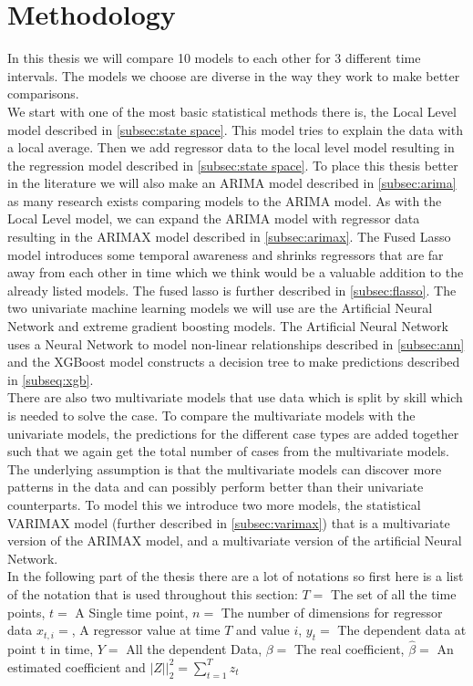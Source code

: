\section{Methodology}
\label{seq:methodology}
In this thesis we will compare 10 models to each other for 3 different time intervals. The models we choose are diverse in the way they work to make better comparisons.\\

We start with one of the most basic statistical methods there is, the Local Level model described in \ref{subsec:state space}. This model tries to explain the data with a local average. Then we add regressor data to the local level model resulting in the regression model described in \autoref{subsec:state space}. To place this thesis better in the literature we will also make an ARIMA model described in \autoref{subsec:arima} as many research exists comparing models to the ARIMA model. As with the Local Level model, we can expand the ARIMA model with regressor data resulting in the ARIMAX model described in \autoref{subsec:arimax}. The Fused Lasso model introduces some temporal awareness and shrinks regressors that are far away from each other in time which we think would be a valuable addition to the already listed models. The fused lasso is further described in \autoref{subsec:flasso}. The two univariate machine learning models we will use are the Artificial Neural Network and extreme gradient boosting models. The Artificial Neural Network uses a Neural Network to model non-linear relationships described in \autoref{subsec:ann} and the XGBoost model constructs a decision tree to make predictions described in \autoref{subseq:xgb}.\\

There are also two multivariate models that use data which is split by skill which is needed to solve the case. To compare the multivariate models with the univariate models, the predictions for the different case types are added together such that we again get the total number of cases from the multivariate models. The underlying assumption is that the multivariate models can discover more patterns in the data and can possibly perform better than their univariate counterparts. To model this we introduce two more models, the statistical VARIMAX model (further described in \autoref{subsec:varimax}) that is a multivariate version of the ARIMAX model, and a multivariate version of the artificial Neural Network.\\

In the following part of the thesis there are a lot of notations so first here is a list of the notation that is used throughout this section: $T =$ The set of all the time points, $t =$ A Single time point, $n =$ The number of dimensions for regressor data $x_{t, i} =$, A regressor value at time $T$ and value $i$, $y_t =$ The dependent data at point t in time, $Y =$ All the dependent Data, $\beta =$ The real coefficient, $\hat{\beta} =$ An estimated coefficient and $|Z||^2_2 = \sum_{t=1}^Tz_t$ 


